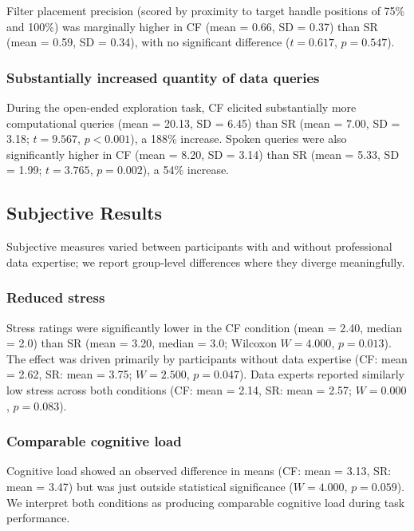 \documentclass[12pt]{cmuthesis}
\begin{document}
Filter placement precision (scored by proximity to target handle positions of 75\% and 100\%) was marginally higher in CF (mean = 0.66, SD = 0.37) than SR (mean = 0.59, SD = 0.34), with no significant difference ($t = 0.617$, $p = 0.547$).

\subsubsection{Substantially increased quantity of data queries}

During the open-ended exploration task, CF elicited substantially more computational queries (mean = 20.13, SD = 6.45) than SR (mean = 7.00, SD = 3.18; $t = 9.567$, $p < 0.001$), a 188\% increase. Spoken queries were also significantly higher in CF (mean = 8.20, SD = 3.14) than SR (mean = 5.33, SD = 1.99; $t = 3.765$, $p = 0.002$), a 54\% increase. 


\subsection{Subjective Results}


Subjective measures varied between participants with and without professional data expertise; we report group-level differences where they diverge meaningfully.

\subsubsection{Reduced stress}

Stress ratings were significantly lower in the CF condition (mean = 2.40, median = 2.0) than SR (mean = 3.20, median = 3.0; Wilcoxon $W = 4.000$, $p = 0.013$). The effect was driven primarily by participants without data expertise (CF: mean = 2.62, SR: mean = 3.75; $W = 2.500$, $p = 0.047$). Data experts reported similarly low stress across both conditions (CF: mean = 2.14, SR: mean = 2.57; $W = 0.000$, $p = 0.083$).

\subsubsection{Comparable cognitive load}

Cognitive load showed an observed difference in means (CF: mean = 3.13, SR: mean = 3.47) but was just outside statistical significance ($W = 4.000$, $p = 0.059$). We interpret both conditions as producing comparable cognitive load during task performance.
\end{document}
